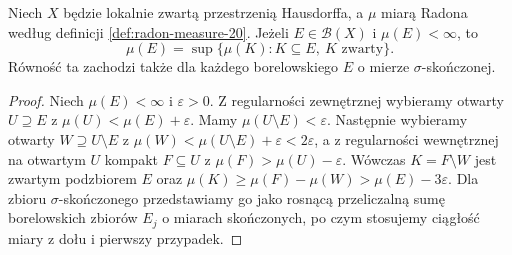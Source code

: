 \begin{lemat}
\label{lem:radon-sigmafinite-inner-20}
Niech $X$ będzie lokalnie zwartą przestrzenią Hausdorffa,
a $\mu$ miarą Radona według definicji
\ref{def:radon-measure-20}. Jeżeli $E\in\mathcal B(X)$
i $\mu(E)<\infty$, to
\[
 \mu(E)=\sup\{\mu(K):K\subseteq E,\ K\text{ zwarty}\}.
\]
Równość ta zachodzi także dla każdego borelowskiego
$E$ o mierze $\sigma$-skończonej.
\end{lemat}
\begin{proof}
Niech $\mu(E)<\infty$ i $\varepsilon>0$.
Z regularności zewnętrznej wybieramy otwarty
$U\supseteq E$ z $\mu(U)<\mu(E)+\varepsilon$.
Mamy $\mu(U\setminus E)<\varepsilon$.
Następnie wybieramy otwarty $W\supseteq U\setminus E$
z $\mu(W)<\mu(U\setminus E)+\varepsilon<2\varepsilon$,
a z regularności wewnętrznej na otwartym $U$ kompakt
$F\subseteq U$ z $\mu(F)>\mu(U)-\varepsilon$.
Wówczas $K=F\setminus W$ jest zwartym podzbiorem $E$ oraz
$\mu(K)\ge\mu(F)-\mu(W)>\mu(E)-3\varepsilon$.
Dla zbioru $\sigma$-skończonego przedstawiamy go jako
rosnącą przeliczalną sumę borelowskich zbiorów
$E_j$ o miarach skończonych, po czym stosujemy
ciągłość miary z dołu i pierwszy przypadek.
\end{proof}

